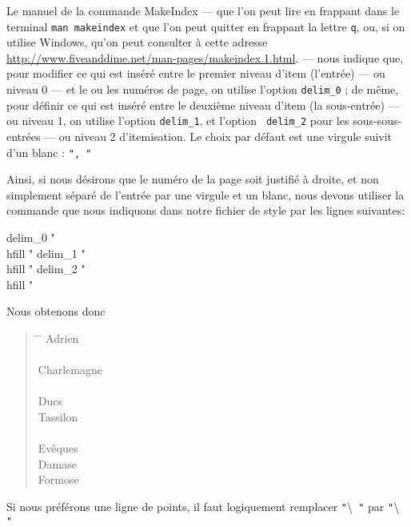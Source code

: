 Le manuel de la commande MakeIndex --- que l'on peut lire en frappant dans le terminal \verb+man makeindex+ et que l'on peut quitter en frappant la lettre  \verb|q|, ou, si on utilise Windows, qu'on peut consulter à cette adresse \url{http://www.fiveanddime.net/man-pages/makeindex.1.html}. --- nous indique que, pour modifier ce qui est inséré entre le premier niveau d'item (l'entrée) --- ou niveau 0 --- et le ou les numéros de page, on utilise l'option \verb|delim_0| ; de même, pour définir ce qui est inséré entre le deuxième niveau d'item (la sous-entrée) --- ou niveau 1, on utilise l'option \verb+delim_1+, et l'option \verb| delim_2| pour les sous-sous-entrées --- ou niveau 2 d'itemisation. Le choix par défaut est une virgule suivit d'un blanc : \verb|", "|

Ainsi, si nous désirons que le numéro de la page soit justifié à droite, et non simplement séparé de l'entrée par une virgule et un blanc, nous devons utiliser la commande  que nous indiquons dans notre fichier de style par les lignes suivantes:

\begin{latexcode}
delim_0 "\\hfill "
delim_1 "\\hfill "
delim_2 "\\hfill "
\end{latexcode}

Nous obtenons donc 

\begin{quotation}
\begin{tabbing}
\hspace{0,5cm}  \=  \hspace{3cm} \= \kill
Adrien\> \\
\\
Charlemagne \> \\
\\
Ducs \\
\> Tassilon\\
\\
Evêques \\
\> Damase \\
\> Formose\\
\end{tabbing}
\end{quotation}

Si nous préférons une ligne de points, il faut logiquement remplacer \verb|"|\textbackslash{}\verb| "| par \verb|"|\textbackslash{}\verb| "|

